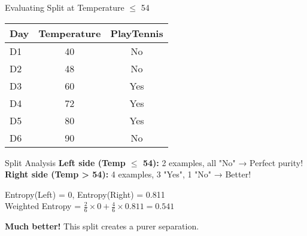 \documentclass[usenames,dvipsnames]{beamer}
\begin{document}
    \begin{frame}{Evaluating Split at Temperature $\leq$ 54}
        \begin{table}[]
            \begin{tabular}{@{}lcc@{}}
                \toprule
                \textbf{Day} & \textbf{Temperature} & \textbf{PlayTennis} \\ \midrule
                D1           & 40                   & No                  \\
                D2           & 48                   & No                  \\
                \hline
                D3           & 60                   & Yes                 \\
                D4           & 72                   & Yes                 \\
                D5           & 80                   & Yes                 \\
                D6           & 90                   & No                  \\ \bottomrule
            \end{tabular}
        \end{table}

        \begin{examplebox}{Split Analysis}
        \textbf{Left side (Temp $\leq$ 54):} 2 examples, all "No" → Perfect purity! \\
        \textbf{Right side (Temp > 54):} 4 examples, 3 "Yes", 1 "No" → Better!

        Entropy(Left) = 0, Entropy(Right) = 0.811 \\
        Weighted Entropy = $\frac{2}{6} \times 0 + \frac{4}{6} \times 0.811 = 0.541$
        \end{examplebox}

        \textbf{Much better!} This split creates a purer separation.
    \end{frame}
\end{document}
